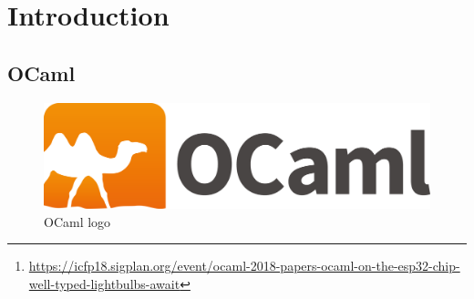 \documentclass[a4paper]{article}
\begin{document}
\begin{abstract}
From March to July 2018 I've been doing my research internship with Anil Madhavapeddy in the University of Cambridge Computer Laboratory's \textit{OCaml Labs}. 
This internship was about systems and compilation for micro-controllers, working with the OCaml programming language, 
the Mirage operating system library and ESP32 as the micro-controller target. My goal was to extend and test OCaml capabilities on embedded devices by 
developing a new compilation backend targeting ESP32 processors and porting Mirage operating system unikernel framework to this platform. 
As this has been achieved with success, this internship results in a proof-of-concept for safe and portable programming on a cross-compiled software environment 
targeting constrained devices. In the end I've been able to get an OCaml compilation backend for ESP32 micro-controllers and a fully working Mirage system including network features, and this work will be presented in a talk at ICFP 2018 OCaml Workshop\footnote{\url{https://icfp18.sigplan.org/event/ocaml-2018-papers-ocaml-on-the-esp32-chip-well-typed-lightbulbs-await}}.
I warmly thank Anil Madhavappedy and Gemma Gordon for having me there, as well as the whole OCaml Labs staff and interns with whom 
I had really good times and for some helped me in my project.
\end{abstract}
\tableofcontents
\newpage
\section{Introduction}
\subsection{OCaml}
\begin{figure}
	\includegraphics[width=\columnwidth/4]{ocaml.png}
    \caption{OCaml logo}
\end{figure}
\end{document}

